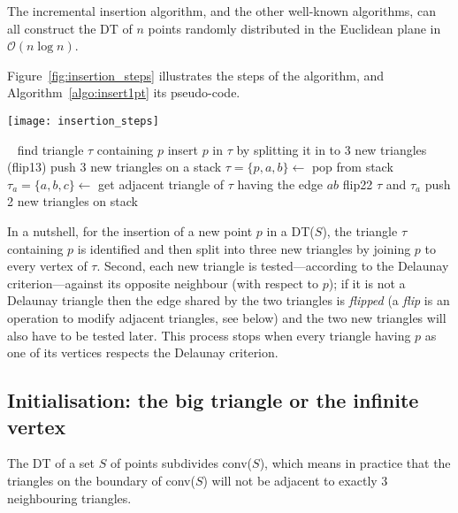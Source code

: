%

The incremental insertion algorithm, and the other well-known algorithms, can all construct the DT of $n$ points randomly distributed in the Euclidean plane in $\mathcal{O}(n \log n)$.

%

Figure~\ref{fig:insertion_steps} illustrates the steps of the algorithm, and Algorithm~\ref{algo:insert1pt} its pseudo-code. 
\begin{figure*}
  \centering
  \texttt{[image: insertion\_steps]}
  \caption{Step-by-step insertion, with flips, of a single point in a DT in two dimensions.}%
\label{fig:insertion_steps}
\end{figure*}
\begin{algorithm}[tb] 
  \DontPrintSemicolon\
  find triangle $\tau$ containing $p$\;
  insert $p$ in $\tau$ by splitting it in to 3 new triangles (flip13)\;
  push 3 new triangles on a stack\;
  {
    $\tau = \{p,a,b\} \leftarrow$ pop from stack\;
    $\tau_{a} = \{a,b,c\} \leftarrow$ get adjacent triangle of $\tau$ having the edge $ab$\;
    \If{$c$ is inside circumcircle of $\tau$}
    {
      flip22 $\tau$ and $\tau_{a}$\;
      push 2 new triangles on stack\;
    }
  }
  \caption{Algorithm to insert one point in a DT}%
\label{algo:insert1pt}
\end{algorithm} 
In a nutshell, for the insertion of a new point $p$ in a DT($S$), the triangle $\tau$ containing $p$ is identified and then split into three new triangles by joining $p$ to every vertex of $\tau$. 
Second, each new triangle is tested---according to the Delaunay criterion---against its opposite neighbour (with respect to $p$); if it is not a Delaunay triangle then the edge shared by the two triangles is \emph{flipped} (a \emph{flip} is an operation to modify adjacent triangles, see below) and the two new triangles will also have to be tested later. 
This process stops when every triangle having $p$ as one of its vertices respects the Delaunay criterion.


\subsection{Initialisation: the big triangle or the infinite vertex}%
\label{sec:big_tr}

The DT of a set $S$ of points subdivides conv($S$), which means in practice that the triangles on the boundary of conv($S$) will not be adjacent to exactly 3 neighbouring triangles.

